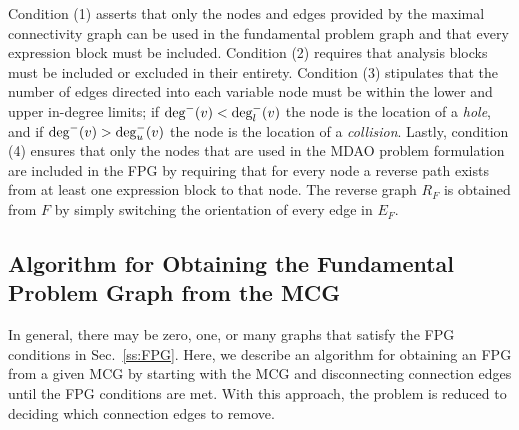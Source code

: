     Condition (1) asserts that only the nodes and edges provided by the maximal connectivity graph can be used in the fundamental problem graph and that every expression block must be included. 
    Condition (2) requires that analysis blocks must be included or excluded in their entirety. 
    Condition (3) stipulates that the number of edges directed into each variable node must be within the lower and upper in-degree limits; 
    if $\textrm{deg}^-(v) < \textrm{deg}_l^-(v)$ the node is the location of a \emph{hole}, and if $\textrm{deg}^-(v) > \textrm{deg}_u^-(v)$ the node is the location of a \emph{collision}.
    Lastly, condition (4) ensures that only the nodes that are used in the MDAO problem formulation are included in the FPG by requiring that for every node a reverse path exists from at least one expression block to that node. 
    The reverse graph $R_F$ is obtained from $F$ by simply switching the orientation of every edge in $E_F$.


\subsection{Algorithm for Obtaining the Fundamental Problem Graph from the MCG}
    \label{ss:obtaining FPG}
    In general, there may be zero, one, or many graphs that satisfy the FPG conditions in Sec.~\ref{ss:FPG}.
    Here, we describe an algorithm for obtaining an FPG from a given MCG by starting with the MCG and disconnecting connection edges until the FPG conditions are met. 
    With this approach, the problem is reduced to deciding which connection edges to remove. 

